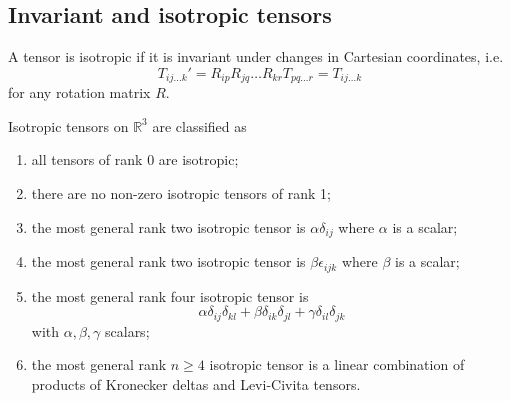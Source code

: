 \documentclass[a4paper]{article}
\begin{document}
\subsection{Invariant and isotropic tensors}
\begin{defi}
A tensor is isotropic if it is invariant under changes in Cartesian coordinates, i.e.
$$T_{ij\dots k}'=R_{ip}R_{jq}\dots R_{kr}T_{pq\dots r}=T_{ij\dots k}$$
for any rotation matrix $R$.
\end{defi}
\begin{prop}
Isotropic tensors on $\mathbb{R}^3$ are classified as
\begin{enumerate}
    \item all tensors of rank 0 are isotropic;
    \item there are no non-zero isotropic tensors of rank 1;
    \item the most general rank two isotropic tensor is $\alpha\delta_{ij}$ where $\alpha$ is a scalar;
    \item the most general rank two isotropic tensor is $\beta\epsilon_{ijk}$ where $\beta$ is a scalar;
    \item the most general rank four isotropic tensor is
    $$\alpha\delta_{ij}\delta_{kl}+\beta\delta_{ik}\delta_{jl}+\gamma\delta_{il}\delta_{jk}$$
    with $\alpha,\beta,\gamma$ scalars;
    \item the most general rank $n\geq 4$ isotropic tensor is a linear combination of products of Kronecker deltas and Levi-Civita tensors.
\end{enumerate}
\end{prop}
\end{document}
